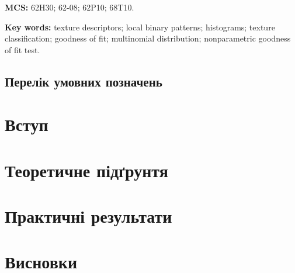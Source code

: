 \documentclass{thesis}
\newcommand{\MSCEn}{62H30; 62-08; 62P10; 68T10.}
\newcommand{\1}{\mathds 1}
\begin{document}
\bigskip

\noindent
{\bf MCS:} \MSCEn %


\bigskip

\noindent
{\bf Key words:} texture descriptors; local binary patterns; histograms; texture classification; goodness of fit; multinomial distribution; nonparametric goodness of fit test.


\newpage


\tableofcontents

\newpage

\section*{Перелік умовних позначень}


\newpage

\chapter*{Вступ}\label{Introduction}


\newpage

\chapter{Теоретичне підґрунтя}\label{chapter1}







\newpage

\chapter{Практичні результати}\label{chapter2}





\newpage

\chapter*{Висновки}
\end{document}
